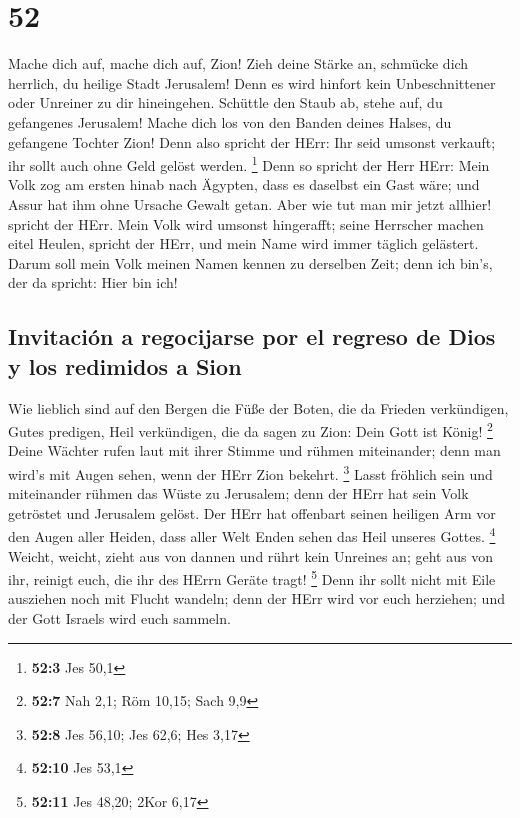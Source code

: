 \hypertarget{section-51}{%
\section{52}\label{section-51}}

 Mache dich auf, mache dich auf, Zion! Zieh deine Stärke
an, schmücke dich herrlich, du heilige Stadt Jerusalem! Denn es wird
hinfort kein Unbeschnittener oder Unreiner zu dir hineingehen.
 Schüttle den Staub ab, stehe auf, du gefangenes
Jerusalem! Mache dich los von den Banden deines Halses, du gefangene
Tochter Zion!  Denn also spricht der HErr: Ihr seid
umsonst verkauft; ihr sollt auch ohne Geld gelöst werden. \footnote{\textbf{52:3}
  Jes 50,1}  Denn so spricht der Herr HErr: Mein Volk zog
am ersten hinab nach Ägypten, dass es daselbst ein Gast wäre; und Assur
hat ihm ohne Ursache Gewalt getan.  Aber wie tut man mir
jetzt allhier! spricht der HErr. Mein Volk wird umsonst hingerafft;
seine Herrscher machen eitel Heulen, spricht der HErr, und mein Name
wird immer täglich gelästert.  Darum soll mein Volk meinen
Namen kennen zu derselben Zeit; denn ich bin's, der da spricht: Hier bin
ich!

\hypertarget{invitaciuxf3n-a-regocijarse-por-el-regreso-de-dios-y-los-redimidos-a-sion}{%
\subsection{Invitación a regocijarse por el regreso de Dios y los
redimidos a
Sion}\label{invitaciuxf3n-a-regocijarse-por-el-regreso-de-dios-y-los-redimidos-a-sion}}

 Wie lieblich sind auf den Bergen die Füße der Boten, die
da Frieden verkündigen, Gutes predigen, Heil verkündigen, die da sagen
zu Zion: Dein Gott ist König! \footnote{\textbf{52:7} Nah 2,1; Röm
  10,15; Sach 9,9}  Deine Wächter rufen laut mit ihrer
Stimme und rühmen miteinander; denn man wird's mit Augen sehen, wenn der
HErr Zion bekehrt. \footnote{\textbf{52:8} Jes 56,10; Jes 62,6; Hes 3,17}
 Lasst fröhlich sein und miteinander rühmen das Wüste zu
Jerusalem; denn der HErr hat sein Volk getröstet und Jerusalem gelöst.
 Der HErr hat offenbart seinen heiligen Arm vor den Augen
aller Heiden, dass aller Welt Enden sehen das Heil unseres Gottes.
\footnote{\textbf{52:10} Jes 53,1}  Weicht, weicht, zieht
aus von dannen und rührt kein Unreines an; geht aus von ihr, reinigt
euch, die ihr des HErrn Geräte tragt! \footnote{\textbf{52:11} Jes
  48,20; 2Kor 6,17}  Denn ihr sollt nicht mit Eile
ausziehen noch mit Flucht wandeln; denn der HErr wird vor euch
herziehen; und der Gott Israels wird euch sammeln.

